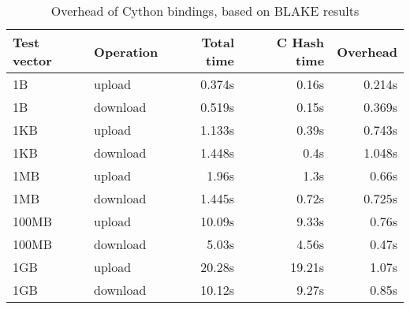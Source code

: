 \begin{table}
  \centering
  \begin{tabular}{ | l | l | r | r | r |}
    \hline
    \textbf{Test vector} & \textbf{Operation} & \textbf{Total time} & \textbf{C Hash time} & \textbf{Overhead} \\ \hline
    1B     &  upload    &  0.374s  &  0.16s   &  0.214s  \\  \hline
    1B     &  download  &  0.519s  &  0.15s   &  0.369s  \\  \hline
    1KB    &  upload    &  1.133s  &  0.39s   &  0.743s  \\  \hline
    1KB    &  download  &  1.448s  &  0.4s    &  1.048s  \\  \hline
    1MB    &  upload    &  1.96s   &  1.3s    &  0.66s   \\  \hline
    1MB    &  download  &  1.445s  &  0.72s   &  0.725s  \\  \hline
    100MB  &  upload    &  10.09s  &  9.33s   &  0.76s   \\  \hline
    100MB  &  download  &  5.03s   &  4.56s   &  0.47s   \\  \hline
    1GB    &  upload    &  20.28s  &  19.21s  &  1.07s   \\  \hline
    1GB    &  download  &  10.12s  &  9.27s   &  0.85s   \\  \hline

  \end{tabular}
  \caption{Overhead of Cython bindings, based on BLAKE results}
  \label{tbl:cython:overhead}
\end{table}
